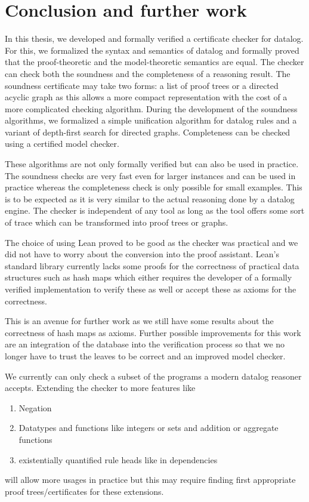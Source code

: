 \section{Conclusion and further work}

In this thesis, we developed and formally verified a certificate checker for datalog. For this, we formalized the syntax and semantics of datalog and formally proved that the proof-theoretic and the model-theoretic semantics are equal. The checker can check both the soundness and the completeness of a reasoning result. The soundness certificate may take two forms: a list of proof trees or a directed acyclic graph as this allows a more compact representation with the cost of a more complicated checking algorithm. During the development of the soundness algorithms, we formalized a simple unification algorithm for datalog rules and a variant of depth-first search for directed graphs. Completeness can be checked using a certified model checker. 

These algorithms are not only formally verified but can also be used in practice. The soundness checks are very fast even for larger instances and can be used in practice whereas the completeness check is only possible for small examples. This is to be expected as it is very similar to the actual reasoning done by a datalog engine. The checker is independent of any tool as long as the tool offers some sort of trace which can be transformed into proof trees or graphs.

The choice of using Lean proved to be good as the checker was practical and we did not have to worry about the conversion into the proof assistant. Lean's standard library currently lacks some proofs for the correctness of practical data structures such as hash maps which either requires the developer of a formally verified implementation to verify these as well or accept these as axioms for the correctness.

This is an avenue for further work as we still have some results about the correctness of hash maps as axioms. Further possible improvements for this work are an integration of the database into the verification process so that we no longer have to trust the leaves to be correct and an improved model checker.

We currently can only check a subset of the programs a modern datalog reasoner accepts. Extending the checker to more features like
\begin{enumerate}
    \item Negation
    \item Datatypes and functions like integers or sets and addition or aggregate functions
    \item existentially quantified rule heads like in dependencies
\end{enumerate}

will allow more usages in practice but this may require finding first appropriate proof trees/certificates for these extensions.